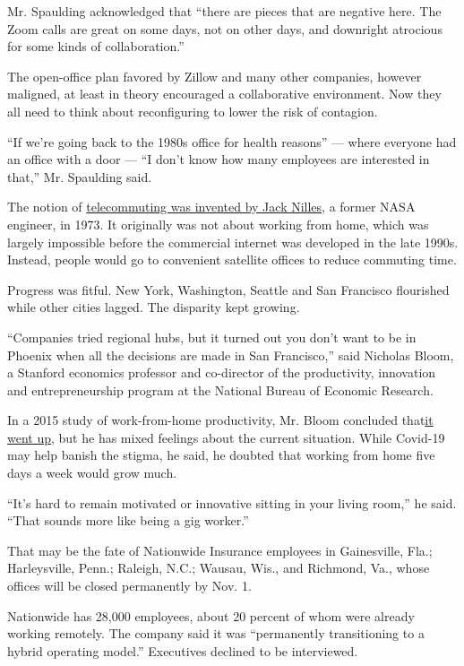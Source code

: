 Mr. Spaulding acknowledged that ``there are pieces that are negative
here. The Zoom calls are great on some days, not on other days, and
downright atrocious for some kinds of collaboration.''

The open-office plan favored by Zillow and many other companies, however
maligned, at least in theory encouraged a collaborative environment. Now
they all need to think about reconfiguring to lower the risk of
contagion.

``If we're going back to the 1980s office for health reasons'' --- where
everyone had an office with a door --- ``I don't know how many employees
are interested in that,'' Mr. Spaulding said.

The notion of
\href{https://www.citylab.com/life/2015/12/the-invention-of-telecommuting/418047/}{telecommuting
was invented by Jack Nilles,} a former NASA engineer, in 1973. It
originally was not about working from home, which was largely impossible
before the commercial internet was developed in the late 1990s. Instead,
people would go to convenient satellite offices to reduce commuting
time.

Progress was fitful. New York, Washington, Seattle and San Francisco
flourished while other cities lagged. The disparity kept growing.

``Companies tried regional hubs, but it turned out you don't want to be
in Phoenix when all the decisions are made in San Francisco,'' said
Nicholas Bloom, a Stanford economics professor and co-director of the
productivity, innovation and entrepreneurship program at the National
Bureau of Economic Research.

In a 2015 study of work-from-home productivity, Mr. Bloom concluded
that\href{https://www.gsb.stanford.edu/faculty-research/publications/does-working-home-work-evidence-chinese-experiment}{it
went up}, but he has mixed feelings about the current situation. While
Covid-19 may help banish the stigma, he said, he doubted that working
from home five days a week would grow much.

``It's hard to remain motivated or innovative sitting in your living
room,'' he said. ``That sounds more like being a gig worker.''

That may be the fate of Nationwide Insurance employees in Gainesville,
Fla.; Harleysville, Penn.; Raleigh, N.C.; Wausau, Wis., and Richmond,
Va., whose offices will be closed permanently by Nov. 1.

Nationwide has 28,000 employees, about 20 percent of whom were already
working remotely. The company said it was ``permanently transitioning to
a hybrid operating model.'' Executives declined to be interviewed.

